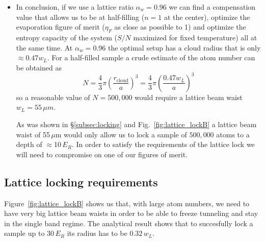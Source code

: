 \documentclass[11pt,letter]{article}
\newcommand{\awaist}{\ensuremath{ \alpha_{w} }}
\begin{document}
\begin{itemize}
\item In conclusion,  if we use a lattice ratio $\awaist=0.96$ we can find a
compensation value that allows us to be at half-filling ($n=1$ at the center),
optimize the evaporation figure of merit ($\eta_{F}$ as close as possible to 1)
and optimize the entropy capacity of the system ($S/N$ maximized for fixed
temperature) all at the same time.   At $\awaist=0.96$ the optimal setup has a
cloud radius that is only $\approx 0.47 w_{L}$.   For a half-filled sample a
crude estimate of the atom number can be obtained as \[  N = \frac{4}{3}\pi
\left( \frac{ r_{\text{cloud}} }{ a } \right)^{3} =  \frac{4}{3}\pi \left(
\frac{ 0.47 w_{L}  }{ a } \right)^{3} \] so a reasonable value of
$N=500,000$  would require a lattice beam waist $w_{L} = 55\,\mu{m}$.   

As was shown in \S\ref{subsec:locking} and Fig.~\ref{fig:lattice_lockB} a
lattice beam waist of 55\,$\mu$m would only allow us to lock a sample of
$500,000$ atoms to a depth of $\approx$10\,$E_{R}$.   In order to satisfy the
requirements of the lattice lock we will need to compromise on one of our
figures of merit. 

\end{itemize}


\subsection{ Lattice locking requirements   } 

Figure~\ref{fig:lattice_lockB} shows us that, with large atom numbers, we need
to have very big lattice beam waists in order to be able to freeze tunneling
and stay in the single band regime.   The analytical result shows that to
succesfully lock a sample up to 30\,$E_{R}$ its radius has to be
$0.32\,w_{L}$.    
\end{document}
